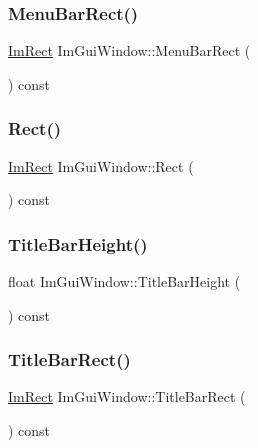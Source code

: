 \hypertarget{struct_im_gui_window_a59df76c1445aaaf0b43456c83c1a88e5}{}\label{struct_im_gui_window_a59df76c1445aaaf0b43456c83c1a88e5} 
\subsubsection{\texorpdfstring{Menu\+Bar\+Rect()}{MenuBarRect()}}
{\footnotesize\ttfamily \hyperlink{struct_im_rect}{Im\+Rect} Im\+Gui\+Window\+::\+Menu\+Bar\+Rect (\begin{DoxyParamCaption}{ }\end{DoxyParamCaption}) const}

\hypertarget{struct_im_gui_window_a147da28bf5d167cbe0a363c4a578dea1}{}\label{struct_im_gui_window_a147da28bf5d167cbe0a363c4a578dea1} 
\subsubsection{\texorpdfstring{Rect()}{Rect()}}
{\footnotesize\ttfamily \hyperlink{struct_im_rect}{Im\+Rect} Im\+Gui\+Window\+::\+Rect (\begin{DoxyParamCaption}{ }\end{DoxyParamCaption}) const}

\hypertarget{struct_im_gui_window_ad1580cc8b5bdf981c6ed2eb22ecd7dbb}{}\label{struct_im_gui_window_ad1580cc8b5bdf981c6ed2eb22ecd7dbb} 
\subsubsection{\texorpdfstring{Title\+Bar\+Height()}{TitleBarHeight()}}
{\footnotesize\ttfamily float Im\+Gui\+Window\+::\+Title\+Bar\+Height (\begin{DoxyParamCaption}{ }\end{DoxyParamCaption}) const}

\hypertarget{struct_im_gui_window_a06884e1bc80e460e51e1626b5b976196}{}\label{struct_im_gui_window_a06884e1bc80e460e51e1626b5b976196} 
\subsubsection{\texorpdfstring{Title\+Bar\+Rect()}{TitleBarRect()}}
{\footnotesize\ttfamily \hyperlink{struct_im_rect}{Im\+Rect} Im\+Gui\+Window\+::\+Title\+Bar\+Rect (\begin{DoxyParamCaption}{ }\end{DoxyParamCaption}) const}




